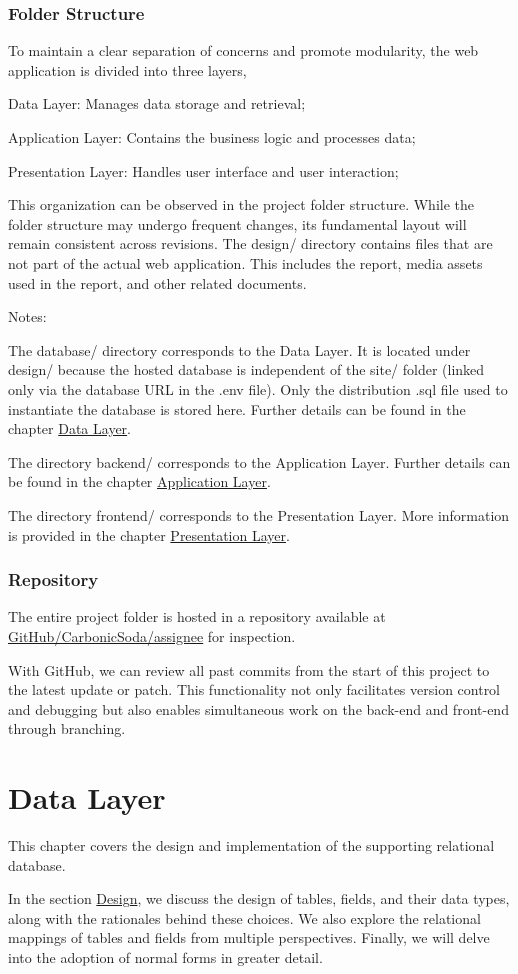 \documentclass[12pt]{report}
\newcommand{\n}{\par}
\newcommand{\br}{\n\vspace{1 em}\n}
\begin{document}
\subsection{Folder Structure} \label{overview.project-structure.folder-structure}
To maintain a clear separation of concerns and promote modularity, the web application is divided into three layers,\n
Data Layer: Manages data storage and retrieval;\n
Application Layer: Contains the business logic and processes data;\n
Presentation Layer: Handles user interface and user interaction;
\br
This organization can be observed in the project folder structure.
While the folder structure may undergo frequent changes, its fundamental layout will remain consistent across revisions.
\newpage
{}
\vspace{2 em}
The design/ directory contains files that are not part of the actual web application.
This includes the report, media assets used in the report, and other related documents.
\br
Notes:\n
The database/ directory corresponds to the Data Layer.
It is located under design/ because the hosted database is independent of the site/ folder (linked only via the database URL in the .env file).
Only the distribution .sql file used to instantiate the database is stored here.
Further details can be found in the chapter \hyperref[data-layer]{Data Layer}.
\br
The directory backend/ corresponds to the Application Layer.
Further details can be found in the chapter \hyperref[application-layer]{Application Layer}.
\br
The directory frontend/ corresponds to the Presentation Layer.
More information is provided in the chapter \hyperref[presentation-layer]{Presentation Layer}.
\subsection{Repository} \label{overview.project-structure.repository}
The entire project folder is hosted in a repository available at
\href{https://github.com/CarbonicSoda/assignee}{GitHub/Carbonic\-Soda/assignee} for inspection.
\br
With GitHub, we can review all past commits from the start of this project to the latest update or patch.
This functionality not only facilitates version control and debugging but also enables simultaneous work on the back-end and front-end through branching.

\chapter{Data Layer} \label{data-layer}
This chapter covers the design and implementation of the supporting relational database.
\br
In the section \hyperref[data-layer.design]{Design}, we discuss the design of tables, fields, and their data types, along with the rationales behind these choices. We also explore the relational mappings of tables and fields from multiple perspectives. Finally, we will delve into the adoption of normal forms in greater detail.
\br
\end{document}
